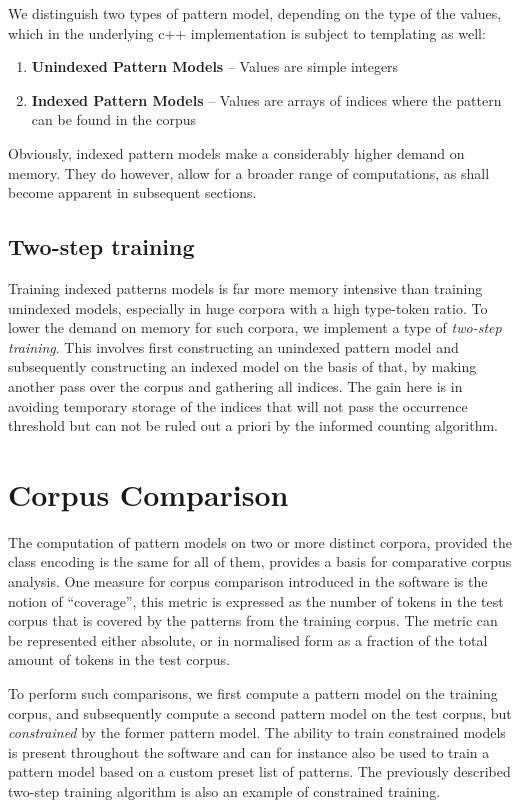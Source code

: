\documentclass[review]{elsarticle}
\begin{document}
We distinguish two types of pattern model, depending on the type of the values,
which in the underlying c++ implementation is subject to templating as well:

\begin{enumerate}
 \item \textbf{Unindexed Pattern Models} -- Values are simple integers
 \item \textbf{Indexed Pattern Models} -- Values are arrays of indices where the pattern can be found in the corpus
\end{enumerate}

Obviously, indexed pattern models make a considerably higher demand on memory.
They do however, allow for a broader range of computations, as shall become
apparent in subsequent sections.

\subsection{Two-step training}

Training indexed patterns models is far more memory intensive than training
unindexed models, especially in huge corpora with a high type-token ratio. To
lower the demand on memory for such corpora, we implement a type of
\emph{two-step training}. This involves first constructing an unindexed pattern
model and subsequently constructing an indexed model on the basis of that, by
making another pass over the corpus and gathering all indices. The gain here is
in avoiding temporary storage of the indices that will not pass the occurrence
threshold but can not be ruled out a priori by the informed counting algorithm.

\section{Corpus Comparison}

The computation of pattern models on two or more distinct corpora, provided the
class encoding is the same for all of them, provides a basis for comparative
corpus analysis. One measure for corpus comparison introduced in the software
is the notion of ``coverage'', this metric is expressed as the number of tokens
in the test corpus that is covered by the patterns from the training corpus.
The metric can be represented either absolute, or in normalised form as a
fraction of the total amount of tokens in the test corpus. 

To perform such comparisons, we first compute a pattern model on the training
corpus, and subsequently compute a second pattern model on the test corpus, but
\emph{constrained} by the former pattern model. The ability to train
constrained models is present throughout the software and can for instance also
be used to train a pattern model based on a custom preset list of patterns. The
previously described two-step training algorithm is also an example of
constrained training.
\end{document}
